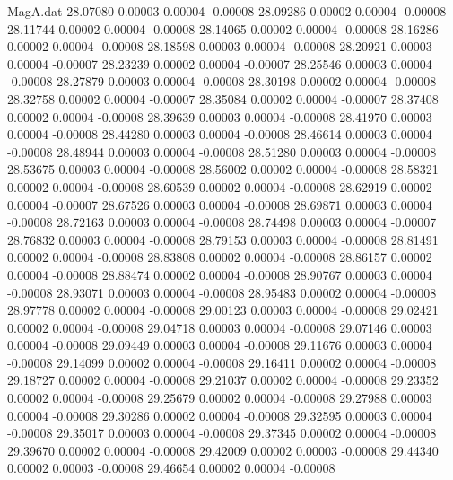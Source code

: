 \begin{filecontents}{MagA.dat}
  28.07080    0.00003    0.00004   -0.00008
  28.09286    0.00002    0.00004   -0.00008
  28.11744    0.00002    0.00004   -0.00008
  28.14065    0.00002    0.00004   -0.00008
  28.16286    0.00002    0.00004   -0.00008
  28.18598    0.00003    0.00004   -0.00008
  28.20921    0.00003    0.00004   -0.00007
  28.23239    0.00002    0.00004   -0.00007
  28.25546    0.00003    0.00004   -0.00008
  28.27879    0.00003    0.00004   -0.00008
  28.30198    0.00002    0.00004   -0.00008
  28.32758    0.00002    0.00004   -0.00007
  28.35084    0.00002    0.00004   -0.00007
  28.37408    0.00002    0.00004   -0.00008
  28.39639    0.00003    0.00004   -0.00008
  28.41970    0.00003    0.00004   -0.00008
  28.44280    0.00003    0.00004   -0.00008
  28.46614    0.00003    0.00004   -0.00008
  28.48944    0.00003    0.00004   -0.00008
  28.51280    0.00003    0.00004   -0.00008
  28.53675    0.00003    0.00004   -0.00008
  28.56002    0.00002    0.00004   -0.00008
  28.58321    0.00002    0.00004   -0.00008
  28.60539    0.00002    0.00004   -0.00008
  28.62919    0.00002    0.00004   -0.00007
  28.67526    0.00003    0.00004   -0.00008
  28.69871    0.00003    0.00004   -0.00008
  28.72163    0.00003    0.00004   -0.00008
  28.74498    0.00003    0.00004   -0.00007
  28.76832    0.00003    0.00004   -0.00008
  28.79153    0.00003    0.00004   -0.00008
  28.81491    0.00002    0.00004   -0.00008
  28.83808    0.00002    0.00004   -0.00008
  28.86157    0.00002    0.00004   -0.00008
  28.88474    0.00002    0.00004   -0.00008
  28.90767    0.00003    0.00004   -0.00008
  28.93071    0.00003    0.00004   -0.00008
  28.95483    0.00002    0.00004   -0.00008
  28.97778    0.00002    0.00004   -0.00008
  29.00123    0.00003    0.00004   -0.00008
  29.02421    0.00002    0.00004   -0.00008
  29.04718    0.00003    0.00004   -0.00008
  29.07146    0.00003    0.00004   -0.00008
  29.09449    0.00003    0.00004   -0.00008
  29.11676    0.00003    0.00004   -0.00008
  29.14099    0.00002    0.00004   -0.00008
  29.16411    0.00002    0.00004   -0.00008
  29.18727    0.00002    0.00004   -0.00008
  29.21037    0.00002    0.00004   -0.00008
  29.23352    0.00002    0.00004   -0.00008
  29.25679    0.00002    0.00004   -0.00008
  29.27988    0.00003    0.00004   -0.00008
  29.30286    0.00002    0.00004   -0.00008
  29.32595    0.00003    0.00004   -0.00008
  29.35017    0.00003    0.00004   -0.00008
  29.37345    0.00002    0.00004   -0.00008
  29.39670    0.00002    0.00004   -0.00008
  29.42009    0.00002    0.00003   -0.00008
  29.44340    0.00002    0.00003   -0.00008
  29.46654    0.00002    0.00004   -0.00008

\end{filecontents}
